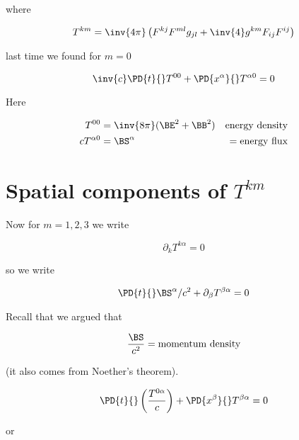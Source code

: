 where

\begin{equation}\label{eqn:relativisticElectrodynamicsL23:n}
T^{k m} = \inv{4 \pi} \left( F^{k j} F^{m l} g_{j l} + \inv{4} g^{k m} F_{i j} F^{i j} \right)
\end{equation}

last time we found for $m = 0$

\begin{equation}\label{eqn:relativisticElectrodynamicsL23:n}
\inv{c} \PD{t}{} T^{0 0} + \PD{x^\alpha}{} T^{\alpha 0} = 0
\end{equation}

Here

\begin{align}\label{eqn:relativisticElectrodynamicsL23:n}
T^{0 0} &= \inv{8 \pi} (\BE^2 + \BB^2) & \mbox{energy density} \\
c T^{\alpha 0} &= \BS^\alpha &= \mbox{energy flux}
\end{align}

\section{Spatial components of $T^{k m}$}

Now for $m = 1,2,3$ we write

\begin{equation}\label{eqn:relativisticElectrodynamicsL23:n}
\partial_k T^{k \alpha} = 0
\end{equation}

so we write

\begin{equation}\label{eqn:relativisticElectrodynamicsL23:n}
\PD{t}{} \BS^\alpha/c^2 + \partial_\beta T^{\beta \alpha} = 0
\end{equation}

Recall that we argued that

\begin{equation}\label{eqn:relativisticElectrodynamicsL23:n}
\frac{\BS}{c^2} = \text{momentum density}
\end{equation}

(it also comes from Noether's theorem).

\begin{equation}\label{eqn:relativisticElectrodynamicsL23:n}
\PD{t}{} \left( \frac{T^{0\alpha}}{c} \right) + \PD{x^\beta}{} T^{\beta \alpha} = 0
\end{equation}

or

